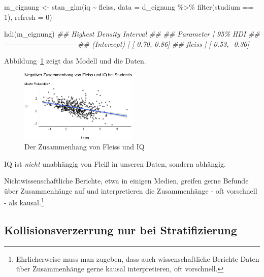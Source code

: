 \documentclass[
  a4paper,
  DIV=11]{scrreprt}
\newenvironment{Shaded}{\begin{snugshade}}{\end{snugshade}}
\newcommand{\AttributeTok}[1]{\textcolor[rgb]{0.40,0.45,0.13}{#1}}
\newcommand{\DecValTok}[1]{\textcolor[rgb]{0.68,0.00,0.00}{#1}}
\newcommand{\DocumentationTok}[1]{\textcolor[rgb]{0.37,0.37,0.37}{\textit{#1}}}
\newcommand{\FunctionTok}[1]{\textcolor[rgb]{0.28,0.35,0.67}{#1}}
\newcommand{\NormalTok}[1]{\textcolor[rgb]{0.00,0.23,0.31}{#1}}
\newcommand{\OtherTok}[1]{\textcolor[rgb]{0.00,0.23,0.31}{#1}}
\newcommand{\SpecialCharTok}[1]{\textcolor[rgb]{0.37,0.37,0.37}{#1}}
\theoremstyle{definition}
\theoremstyle{remark}
\begin{document}
\begin{Shaded}
\begin{Highlighting}[]
\NormalTok{m\_eignung }\OtherTok{\textless{}{-}}
  \FunctionTok{stan\_glm}\NormalTok{(iq }\SpecialCharTok{\textasciitilde{}}\NormalTok{ fleiss, }\AttributeTok{data =}\NormalTok{ d\_eignung }\SpecialCharTok{\%\textgreater{}\%}  \FunctionTok{filter}\NormalTok{(studium }\SpecialCharTok{==} \DecValTok{1}\NormalTok{), }\AttributeTok{refresh =} \DecValTok{0}\NormalTok{)}

\FunctionTok{hdi}\NormalTok{(m\_eignung)}
\DocumentationTok{\#\# Highest Density Interval}
\DocumentationTok{\#\# }
\DocumentationTok{\#\# Parameter   |        95\% HDI}
\DocumentationTok{\#\# {-}{-}{-}{-}{-}{-}{-}{-}{-}{-}{-}{-}{-}{-}{-}{-}{-}{-}{-}{-}{-}{-}{-}{-}{-}{-}{-}{-}}
\DocumentationTok{\#\# (Intercept) | [ 0.70,  0.86]}
\DocumentationTok{\#\# fleiss      | [{-}0.53, {-}0.36]}
\end{Highlighting}
\end{Shaded}

Abbildung~\ref{fig-eignung} zeigt das Modell und die Daten.

\begin{figure}

{\centering \includegraphics[width=0.5\textwidth,height=\textheight]{./kausal_files/figure-pdf/fig-eignung-1.pdf}

}

\caption{\label{fig-eignung}Der Zusammenhang von Fleiss und IQ}

\end{figure}

IQ ist \emph{nicht} unabhängig von Fleiß in unseren Daten, sondern
abhängig.

Nichtwissenschaftliche Berichte, etwa in einigen Medien, greifen gerne
Befunde über Zusammenhänge auf und interpretieren die Zusammenhänge -
oft vorschnell - als kausal.\footnote{Ehrlicherweise muss man zugeben,
  dass auch wissenschaftliche Berichte Daten über Zusammenhänge gerne
  kausal interpretieren, oft vorschnell.}

\hypertarget{kollisionsverzerrung-nur-bei-stratifizierung}{%
\subsection{Kollisionsverzerrung nur bei
Stratifizierung}\label{kollisionsverzerrung-nur-bei-stratifizierung}}
\end{document}
